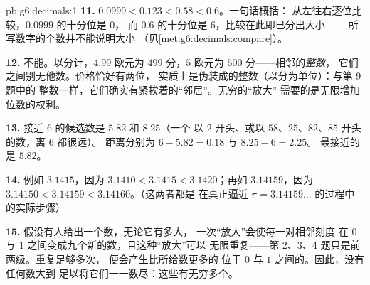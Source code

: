 \begin{solution}{pb:g6:decimals:1}
\textbf{11.} $0.0999 < 0.123 < 0.58 < 0.6$。一句话概括：
从左往右逐位比较，$0.0999$ 的十分位是 $0$，
而 $0.6$ 的十分位是 $6$，比较在此即已分出大小——
所写数字的个数并不能说明大小
（见\cref{met:g6:decimals:compare}）。

\textbf{12.} 不能。以分计，$4.99$ 欧元为 $499$ 分，$5$
欧元为 $500$ 分——相邻的\emph{整数}，
它们之间别无他数。价格恰好有两位，
实质上是伪装成的整数（以分为单位）：与第 9 题中的
整数一样，它们确实有紧挨着的“邻居”。无穷的“放大”
需要的是无限增加位数的权利。

\textbf{13.} 接近 $6$ 的候选数是 $5.82$ 和 $8.25$（一个
以 $2$ 开头、或以 $58$、$25$、$82$、$85$ 开头的数，离 $6$ 都很远）。
距离分别为 $6 - 5.82 = 0.18$ 与 $8.25 - 6 = 2.25$。
最接近的是 $5.82$。

\textbf{14.} 例如 $3.1415$，因为
$3.1410 < 3.1415 < 3.1420$；再如 $3.14159$，因为
$3.14150 < 3.14159 < 3.14160$。（这两者都是
在真正逼近 $\pi = 3.14159\dots$ 的过程中的实际步骤）

\textbf{15.} 假设有人给出一个数，无论它有多大，
一次“放大”会使每一对相邻刻度
在 $0$ 与 $1$ 之间变成九个新的数，且这种“放大”可以
无限重复——第 2、3、4 题只是前两级。重复足够多次，
便会产生比所给数更多的
位于 $0$ 与 $1$ 之间的。因此，没有任何数大到
足以将它们一一数尽：这些有无穷多个。
\end{solution}
